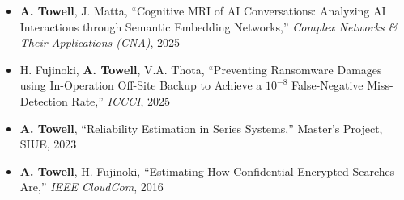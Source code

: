 \documentclass[a4paper,12pt]{memoir} %
\begin{document}
\userinformation %

\framebreak %








\begin{itemize}
    \item \textbf{A. Towell}, J. Matta, ``Cognitive MRI of AI Conversations: Analyzing AI Interactions through Semantic Embedding Networks,'' \textit{Complex Networks \& Their Applications (CNA)}, 2025
    \item H. Fujinoki, \textbf{A. Towell}, V.A. Thota, ``Preventing Ransomware Damages using In-Operation Off-Site Backup to Achieve a $10^{-8}$ False-Negative Miss-Detection Rate,'' \textit{ICCCI}, 2025
    \item \textbf{A. Towell}, ``Reliability Estimation in Series Systems,'' Master's Project, SIUE, 2023
    \item \textbf{A. Towell}, H. Fujinoki, ``Estimating How Confidential Encrypted Searches Are,'' \textit{IEEE CloudCom}, 2016
\end{itemize}

\Sep
\end{document}

